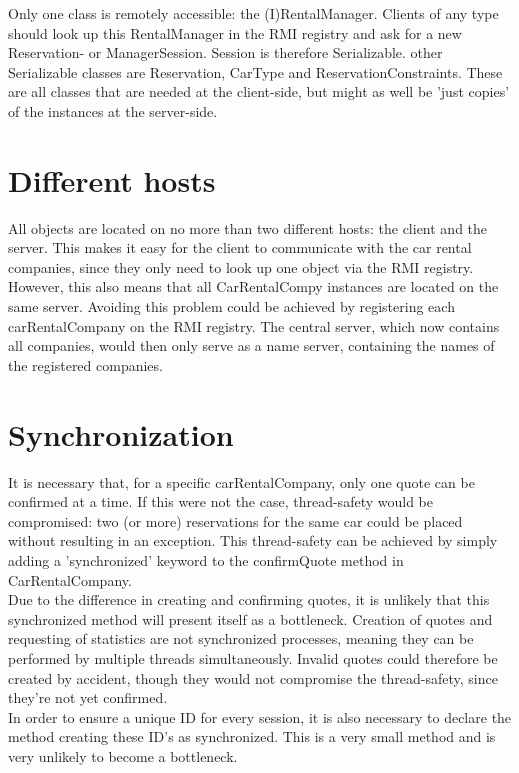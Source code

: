 \documentclass[a4paper,10pt]{article}
\begin{document}
Only one class is remotely accessible: the (I)RentalManager. Clients of any type should look up this RentalManager in the RMI registry and ask for a new Reservation- or ManagerSession. Session is therefore Serializable. other Serializable classes are Reservation, CarType and ReservationConstraints. These are all classes that are needed at the client-side, but might as well be 'just copies' of the instances at the server-side.

\section{Different hosts}

All objects are located on no more than two different hosts: the client and the server. This makes it easy for the client to communicate with the car rental companies, since they only need to look up one object via the RMI registry. However, this also means that all CarRentalCompy instances are located on the same server. Avoiding this problem could be achieved by registering each carRentalCompany on the RMI registry. The central server, which now contains all companies, would then only serve as a name server, containing the names of the registered companies.

\section{Synchronization}

It is necessary that, for a specific carRentalCompany, only one quote can be confirmed at a time. If this were not the case, thread-safety would be compromised: two (or more) reservations for the same car could be placed without resulting in an exception. This thread-safety can be achieved by simply adding a 'synchronized' keyword to the confirmQuote method in CarRentalCompany.\\

Due to the difference in creating and confirming quotes, it is unlikely that this synchronized method will present itself as a bottleneck. Creation of quotes and requesting of statistics are not synchronized processes, meaning they can be performed by multiple threads simultaneously. Invalid quotes could therefore be created by accident, though they would not compromise the thread-safety, since they're not yet confirmed.\\

In order to ensure a unique ID for every session, it is also necessary to declare the method creating these ID's as synchronized. This is a very small method and is very unlikely to become a bottleneck.




\end{document}
